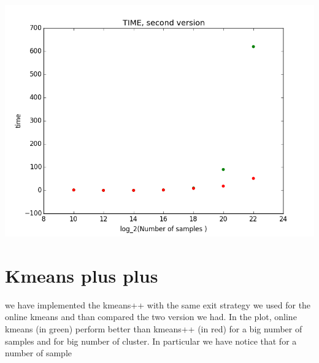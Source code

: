 \documentclass[12pt]{article}
\begin{document}
\begin{table}
\includegraphics[scale=0.4]{time_secondVersion.png}
  \end{table}
  
  
  \newpage
\section{Kmeans plus plus}
we have implemented the kmeans++ with the same exit strategy we used for the online kmeans and than compared the two version we had. In the plot, online kmeans (in green) perform better than kmeans++ (in red) for a big number of samples and for big number of cluster. In particular we have notice that for a number of sample 

  
  
\end{document}
